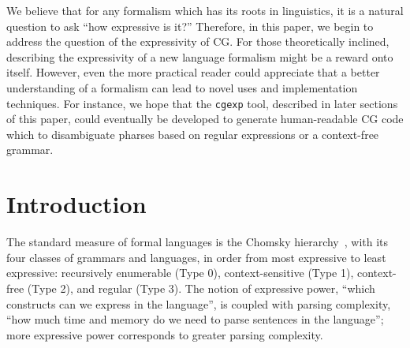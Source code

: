 \documentclass[11pt]{article}
\begin{document}
We believe that for any formalism which has its roots in linguistics, it is a
natural question to ask ``how expressive is it?''
Therefore, in this paper, we begin to address the question of the expressivity
of CG. 
For those theoretically inclined, describing the expressivity of a new language
formalism might be a reward onto itself. 
However, even the more practical reader could appreciate that a better
understanding of a formalism can lead to novel uses and implementation
techniques. 
For instance, we hope that the \texttt{cgexp} tool, described in later sections
of this paper, could eventually be developed to generate human-readable CG code
which to disambiguate pharses based on regular expressions or a
context-free grammar. 


\section{Introduction}
The standard measure of formal languages is the Chomsky hierarchy~\cite{chomsky1956hierarchy}, with its four
classes of grammars and languages, in order from most expressive to least expressive:
recursively enumerable (Type 0), context-sensitive (Type 1), context-free (Type 2), and
regular (Type 3).
The notion of expressive power, ``which constructs can we express in the language'', is coupled with parsing complexity, ``how much time and memory do we need to parse sentences in the language''; more expressive power corresponds to greater parsing complexity.
\end{document}
